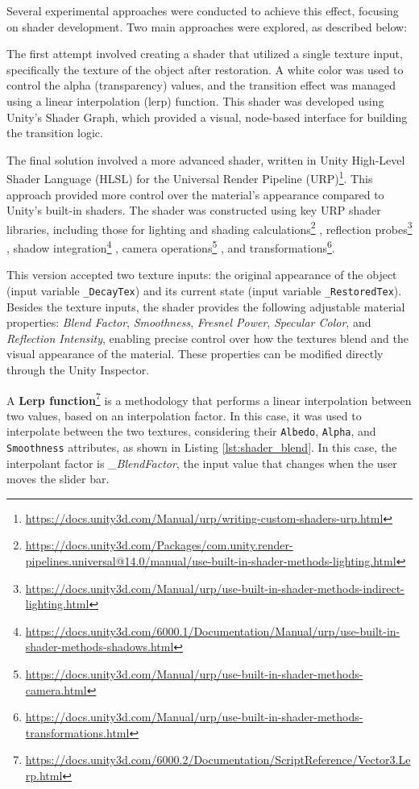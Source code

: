 Several experimental approaches were conducted to achieve this effect, focusing on shader development.
Two main approaches were explored, as described below:

The first attempt involved creating a shader that utilized a single texture input, specifically the texture of the object after restoration. A white color was used to control the alpha (transparency) values, and the transition effect was managed using a linear interpolation (lerp) function. This shader was developed using Unity’s Shader Graph, which provided a visual, node-based interface for building the transition logic.


The final solution involved a more advanced shader, written in Unity High-Level Shader Language (HLSL) for the Universal Render Pipeline (URP)\footnote{\url{https://docs.unity3d.com/Manual/urp/writing-custom-shaders-urp.html}}. 
This approach provided more control over the material's appearance compared to Unity's built-in shaders.
The shader was constructed using key URP shader libraries, including those for lighting and shading calculations\footnote{\url{https://docs.unity3d.com/Packages/com.unity.render-pipelines.universal@14.0/manual/use-built-in-shader-methods-lighting.html}}
, reflection probes\footnote{\url{https://docs.unity3d.com/Manual/urp/use-built-in-shader-methods-indirect-lighting.html}}
, shadow integration\footnote{\url{https://docs.unity3d.com/6000.1/Documentation/Manual/urp/use-built-in-shader-methods-shadows.html}}
, camera operations\footnote{\url{https://docs.unity3d.com/Manual/urp/use-built-in-shader-methods-camera.html}}
, and transformations\footnote{\url{https://docs.unity3d.com/Manual/urp/use-built-in-shader-methods-transformations.html}}.

This version accepted two texture inputs: the original appearance of the object (input variable \texttt{\_DecayTex}) and its current state (input variable \texttt{\_RestoredTex}).
Besides the texture inputs, the shader provides the following adjustable material properties: \emph{Blend Factor}, \emph{Smoothness}, \emph{Fresnel Power}, \emph{Specular Color}, and \emph{Reflection Intensity}, enabling precise control over how the textures blend and the visual appearance of the material. 
These properties can be modified directly through the Unity Inspector.

A \textbf{Lerp function}\footnote{\url{https://docs.unity3d.com/6000.2/Documentation/ScriptReference/Vector3.Lerp.html}} is a methodology that performs a linear interpolation between two values, based on an interpolation factor.
In this case, it was used to interpolate between the two textures, considering their \texttt{Albedo}, \texttt{Alpha}, and \texttt{Smoothness} attributes, as shown in Listing \ref{lst:shader_blend}. 
In this case, the interpolant factor is \emph{\_BlendFactor}, the input value that changes when the user moves the slider bar.

